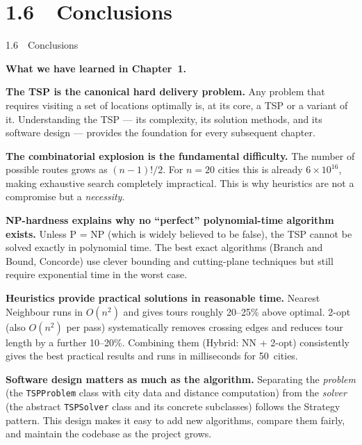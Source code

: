 \documentclass[aspectratio=169,10pt]{beamer}
\begin{document}
\section{1.6~~Conclusions}

\begin{frame}[allowframebreaks]{1.6~~Conclusions}

  \textbf{What we have learned in Chapter~1.}

  \medskip
  \textbf{The TSP is the canonical hard delivery problem.}
  Any problem that requires visiting a set of locations optimally is, at
  its core, a TSP or a variant of it.  Understanding the TSP --- its
  complexity, its solution methods, and its software design --- provides
  the foundation for every subsequent chapter.

  \medskip
  \textbf{The combinatorial explosion is the fundamental difficulty.}
  The number of possible routes grows as $(n-1)!/2$.  For $n = 20$
  cities this is already $6 \times 10^{16}$, making exhaustive search
  completely impractical.  This is why heuristics are not a compromise
  but a \emph{necessity}.

  \medskip
  \textbf{NP-hardness explains why no ``perfect'' polynomial-time
  algorithm exists.}
  Unless P = NP (which is widely believed to be false), the TSP cannot
  be solved exactly in polynomial time.  The best exact algorithms
  (Branch and Bound, Concorde) use clever bounding and cutting-plane
  techniques but still require exponential time in the worst case.

  \medskip
  \textbf{Heuristics provide practical solutions in reasonable time.}
  Nearest Neighbour runs in $O(n^2)$ and gives tours roughly 20--25\%
  above optimal.  2-opt (also $O(n^2)$ per pass) systematically removes
  crossing edges and reduces tour length by a further 10--20\%.
  Combining them (Hybrid: NN + 2-opt) consistently gives the best
  practical results and runs in milliseconds for 50~cities.

\framebreak

  \textbf{Software design matters as much as the algorithm.}
  Separating the \emph{problem} (the \texttt{TSPProblem} class with city
  data and distance computation) from the \emph{solver} (the abstract
  \texttt{TSPSolver} class and its concrete subclasses) follows the
  Strategy pattern.  This design makes it easy to add new algorithms,
  compare them fairly, and maintain the codebase as the project grows.


\end{frame}
\end{document}
